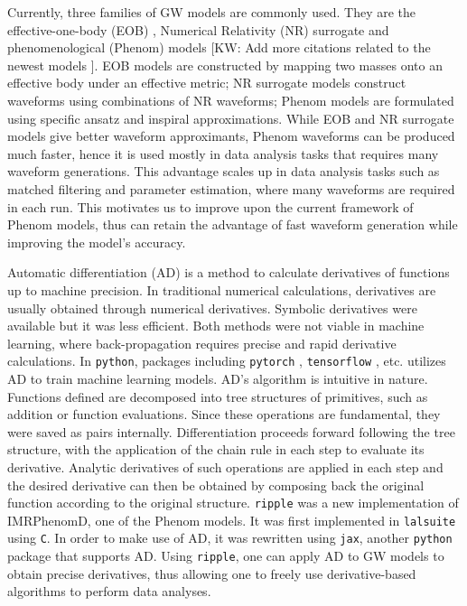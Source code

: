 \documentclass[twocolumn]{aastex631}
\newcommand{\ripple}{\texttt{ripple}}
\newcommand{\python}{\texttt{python}}
\newcommand{\jax}{\texttt{jax}}
\newcommand{\kw}[1]{{\color{rb4}[KW: #1 ]}}
\begin{document}
Currently, three families of GW models are commonly used. They are the
effective-one-body (EOB) \citep{ossokine2020multipolar, cotesta2020frequency, taracchini2014effective}, Numerical Relativity
(NR) surrogate \citep{islam2022surrogate, varma2019surrogate, varma2019surrogate2} and phenomenological (Phenom) models
\citep{husa2016frequency, khan2016frequency, garcia2020multimode, pratten2021computationally} \kw{Add more citations related to
the newest models}. EOB models are constructed by mapping two masses onto an
effective body under an effective metric; NR surrogate models construct
waveforms using combinations of NR waveforms; Phenom models are formulated using
specific ansatz and inspiral approximations. While EOB and NR surrogate models
give better waveform approximants, Phenom waveforms can be produced much faster,
hence it is used mostly in data analysis tasks that requires many waveform
generations. This advantage scales up in data analysis tasks such as matched
filtering and parameter estimation, where many waveforms are required in each
run. This motivates us to improve upon the current framework of Phenom models,
thus can retain the advantage of fast waveform generation while improving the
model's accuracy. 

Automatic differentiation (AD) is a method to calculate derivatives of functions
up to machine precision. In traditional numerical calculations, derivatives are
usually obtained through numerical derivatives. Symbolic derivatives were
available but it was less efficient. Both methods were not viable in machine
learning, where back-propagation requires precise and rapid derivative
calculations. In {\python}, packages including \texttt{pytorch} \citep{pytorch},
\texttt{tensorflow} \citep{tensorflow2015-whitepaper}, etc. utilizes AD to train
machine learning models. AD's algorithm is intuitive in nature. Functions
defined are decomposed into tree structures of primitives, such as addition or
function evaluations. Since these operations are fundamental, they were saved as
pairs internally. Differentiation proceeds forward following the tree structure,
with the application of the chain rule in each step to evaluate its derivative.
Analytic derivatives of such operations are applied in each step and the desired
derivative can then be obtained by composing back the original function
according to the original structure. {\ripple} \citep{ripple} was a new
implementation of IMRPhenomD, one of the Phenom models. It was first implemented
in \texttt{lalsuite} using \texttt{C}. In order to make use of AD, it was
rewritten using \jax, another {\python} package that supports AD. Using
{\ripple}, one can apply AD to GW models to obtain precise derivatives, thus
allowing one to freely use derivative-based algorithms to perform data analyses. 
\end{document}
